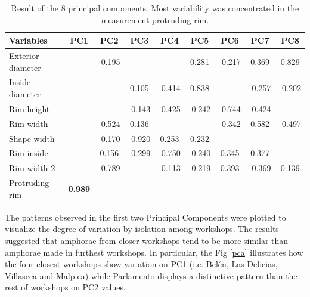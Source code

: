 \documentclass[review]{elsarticle}
\begin{document}
\begin{table}[htp]
\begin{tabular}{lcccccccc}
\hline
 Variables		&    PC1 & PC2	& PC3 & PC4 & PC5 & PC6 & PC7 & PC8     \\ \hline
 Exterior diameter& 		 &-0.195	&	  &  	&0.281&-0.217&0.369&0.829           \\
 Inside diameter& 		 &		&0.105&-0.414&0.838&	    &-0.257&-0.202           \\
 Rim height&              &      &-0.143&-0.425&-0.242&-0.744&-0.424&           \\
 Rim width&       		 &-0.524	&0.136&  	&	  &-0.342&0.582&-0.497        \\
 Shape width&     		 &-0.170	&-0.920&0.253&0.232&		&     &          \\
 Rim inside&     		 &0.156 &-0.299&-0.750&-0.240&0.345&0.377&          \\                                    
 Rim width 2& 	         &-0.789	&	  &-0.113&-0.219	&0.393&-0.369&0.139          \\	
Protruding rim& \textbf{0.989} &      &      &     &     &     &     &          \\
\hline
\end{tabular}
\caption{Result of the 8 principal components. Most variability was concentrated in the measurement protruding rim.}
\label{table:variable}
\end{table}

The patterns observed in the first two Principal Components were plotted to visualize the degree of variation by isolation among workshops. The results suggested that amphorae from closer workshops tend to be more similar than amphorae made in furthest workshops. In particular, the Fig \ref{pca} illustrates how the four closest workshops show variation on PC1 (i.e. Bel\'en, Las Delicias, Villaseca and Malpica) while Parlamento displays a distinctive pattern than the rest of workshops on PC2 values. 
\end{document}
